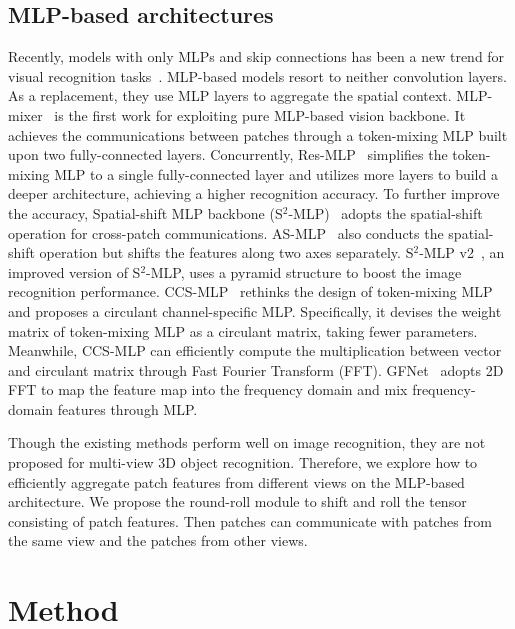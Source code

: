 \documentclass[11pt]{article}
\begin{document}
\subsection{MLP-based architectures}
Recently, models with only MLPs and skip connections has been a new trend for visual recognition tasks~\citep{tolstikhin2021mlp,touvron2022resmlp,yu2022s2mlp,yu2021rethinking,yu2021s2mlpv2}. MLP-based models resort to neither convolution layers. As a replacement, they use MLP layers to aggregate the spatial context. MLP-mixer~\citep{tolstikhin2021mlp} is the first work for exploiting pure MLP-based vision backbone. It achieves the communications between patches through a token-mixing MLP built upon two fully-connected layers. Concurrently, Res-MLP~\citep{touvron2022resmlp} simplifies the token-mixing MLP to a single fully-connected layer and utilizes more layers to build a deeper architecture, achieving a higher recognition accuracy. To further improve the accuracy, Spatial-shift MLP backbone (S$^2$-MLP)~\citep{yu2022s2mlp} adopts the spatial-shift operation for cross-patch communications. AS-MLP~\citep{lian2022as} also conducts the spatial-shift operation but shifts the features along two axes separately. S$^2$-MLP v2~\citep{yu2021s2mlpv2}, an improved version of S$^2$-MLP, uses a pyramid structure to boost the image recognition performance. CCS-MLP~\citep{yu2021rethinking} rethinks the design of token-mixing MLP and proposes a circulant channel-specific MLP. Specifically, it devises the weight matrix of token-mixing MLP as a circulant matrix, taking fewer parameters. Meanwhile, CCS-MLP can efficiently compute the multiplication between vector and circulant matrix through Fast Fourier Transform (FFT). GFNet~\citep{rao2021global} adopts 2D FFT to map the feature map into the frequency domain and mix frequency-domain features through MLP.

Though the existing methods perform well on image recognition, they are not proposed for multi-view 3D object recognition. Therefore, we explore how to efficiently aggregate patch features from different views on the MLP-based architecture. We propose the round-roll module to shift and roll the tensor consisting of patch features. Then patches can communicate with patches from the same view and the patches from other views.

\section{Method}
\end{document}

